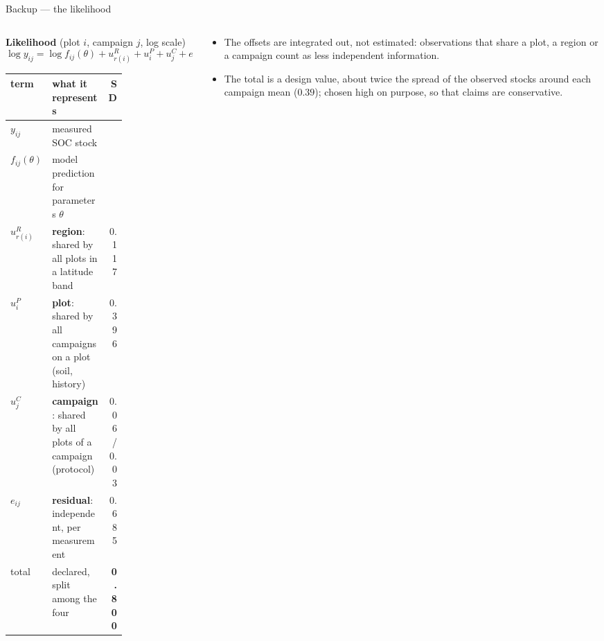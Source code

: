 \documentclass[aspectratio=169,11pt]{beamer}
\begin{document}
\begin{frame}{Backup --- the likelihood}
  \begin{columns}[T]
    \begin{column}{0.6\textwidth}
      \footnotesize
      \textbf{Likelihood} (plot $i$, campaign $j$, log scale)
      \[
        \log y_{ij} = \log f_{ij}(\theta) + u^{R}_{r(i)} + u^{P}_{i} + u^{C}_{j} + e_{ij}
      \]
      \vspace{-0.6em}
      \scriptsize
      \begin{tabular}{@{}l p{0.62\linewidth} r@{}}
        \toprule
        term & what it represents & SD \\
        \midrule
        $y_{ij}$ & measured SOC stock & \\
        $f_{ij}(\theta)$ & model prediction for parameters $\theta$ & \\
        $u^{R}_{r(i)}$ & \textbf{region}: shared by all plots in a latitude band & 0.117 \\
        $u^{P}_{i}$ & \textbf{plot}: shared by all campaigns on a plot (soil, history) & 0.396 \\
        $u^{C}_{j}$ & \textbf{campaign}: shared by all plots of a campaign (protocol) & 0.06 / 0.03 \\
        $e_{ij}$ & \textbf{residual}: independent, per measurement & 0.685 \\
        \midrule
        total & declared, \alert{split} among the four & \textbf{0.800} \\
        \bottomrule
      \end{tabular}
    \end{column}
    \begin{column}{0.38\textwidth}
      \footnotesize
      \begin{itemize}
        \item The offsets are \alert{integrated out}, not estimated: observations that share a plot, a region or a campaign count as less independent information.
        \item The total is a design value, about twice the spread of the observed stocks around each campaign mean ($0.39$); chosen high on purpose, so that claims are conservative.
      \end{itemize}
    \end{column}
  \end{columns}

\end{frame}
\end{document}
